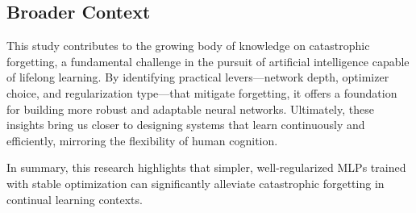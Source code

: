 \documentclass{article}
\begin{document}
\subsection{Broader Context}
This study contributes to the growing body of knowledge on catastrophic forgetting, a fundamental challenge in the pursuit of artificial intelligence capable of lifelong learning. By identifying practical levers—network depth, optimizer choice, and regularization type—that mitigate forgetting, it offers a foundation for building more robust and adaptable neural networks. Ultimately, these insights bring us closer to designing systems that learn continuously and efficiently, mirroring the flexibility of human cognition.

In summary, this research highlights that simpler, well-regularized MLPs trained with stable optimization can significantly alleviate catastrophic forgetting in continual learning contexts.
\end{document}
